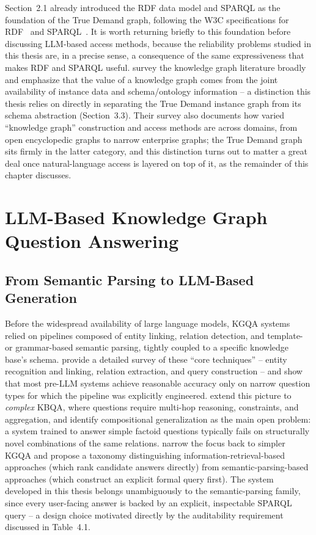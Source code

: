 \documentclass[
  12pt,
  english,
  oneside]{report}
\begin{document}
Section~2.1 already introduced the RDF data model and SPARQL as the
foundation of the True Demand graph, following the W3C specifications for
RDF~\cite{cyganiak2014rdf} and SPARQL~\cite{harris2013sparql}. It is worth
returning briefly to this foundation before discussing LLM-based access
methods, because the reliability problems studied in this thesis are, in a
precise sense, a consequence of the same expressiveness that makes RDF and
SPARQL useful. \citet{hogan2021knowledge} survey the knowledge graph
literature broadly and emphasize that the value of a knowledge graph comes
from the joint availability of instance data and schema/ontology
information -- a distinction this thesis relies on directly in separating
the True Demand instance graph from its schema abstraction
(Section~3.3). Their survey also documents how varied ``knowledge graph''
construction and access methods are across domains, from open encyclopedic
graphs to narrow enterprise graphs; the True Demand graph sits firmly in
the latter category, and this distinction turns out to matter a great deal
once natural-language access is layered on top of it, as the remainder of
this chapter discusses.

\section{LLM-Based Knowledge Graph Question Answering}
\label{sec:llm-kgqa-detailed}

\subsection{From Semantic Parsing to LLM-Based Generation}

Before the widespread availability of large language models, KGQA systems
relied on pipelines composed of entity linking, relation detection, and
template- or grammar-based semantic parsing, tightly coupled to a specific
knowledge base's schema. \citet{diefenbach2018core} provide a detailed
survey of these ``core techniques'' -- entity recognition and linking,
relation extraction, and query construction -- and show that most
pre-LLM systems achieve reasonable accuracy only on narrow question types
for which the pipeline was explicitly engineered. \citet{lan2021survey}
extend this picture to \emph{complex} KBQA, where questions require
multi-hop reasoning, constraints, and aggregation, and identify
compositional generalization as the main open problem: a system trained to
answer simple factoid questions typically fails on structurally novel
combinations of the same relations. \citet{yani2021challenges} narrow the
focus back to simpler KGQA and propose a taxonomy distinguishing
information-retrieval-based approaches (which rank candidate answers
directly) from semantic-parsing-based approaches (which construct an
explicit formal query first). The system developed in this thesis belongs
unambiguously to the semantic-parsing family, since every user-facing
answer is backed by an explicit, inspectable SPARQL query -- a design
choice motivated directly by the auditability requirement discussed in
Table~4.1.
\end{document}

